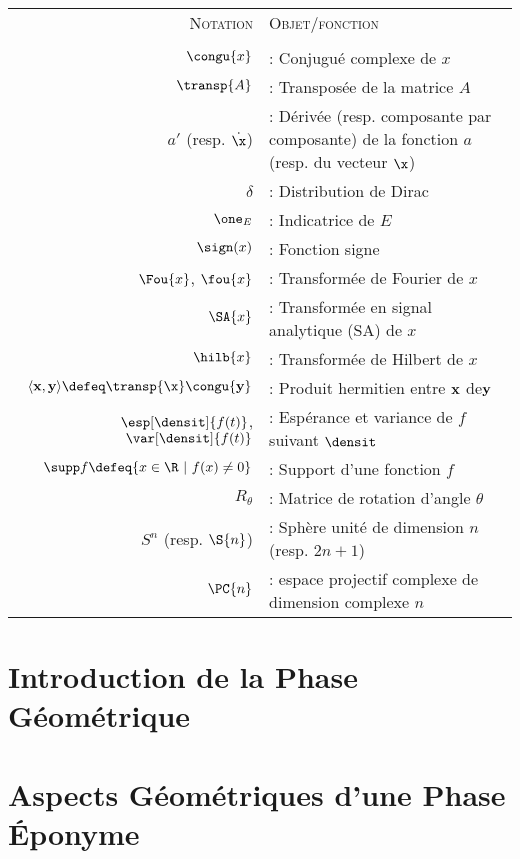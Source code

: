  \begin{tabular}{ r  l } 
	\textsc{Notation}\qquad\qquad  & \qquad\qquad\textsc{Objet/fonction} \\ \\
	$\congu{x}$  &  : Conjugué complexe  de $x$ \\ 
	$\transp{A}$   &  : Transposée de la matrice $A$ \\ 
	$a'$ (resp. $\dot{\x}$)   & :  Dérivée (resp. composante par composante) de la fonction $a$ (resp. du vecteur $\x$) \\ 
	$\delta$  &  : Distribution de Dirac\\ 
	$\one_E$  &  : Indicatrice de $E$ \\ 
	$\sign(x)$  &  : Fonction signe \\ 
	$\Fou{x}$, $\fou{x}$  &  : Transformée de Fourier de $x$ \\ 
	$\SA{x}$  &  : Transformée en signal analytique (SA) de $x$\\ 
	$\hilb{x}$   &  : Transformée de Hilbert de $x$\\ 
	$\langle \bf{x}, \bf{y}\rangle\defeq \transp{\x}\congu{\bf{y}}$  &  : Produit hermitien entre $\bf{x}$ de$\bf{y}$\\ 
	$\esp[\densit]{f(t)}$, $\var[\densit]{f(t)}$  &  : Espérance et variance de $f$ suivant $\densit$  \\ 
	$\supp f \defeq\{x\in\R\ |\ f(x)\neq0\}$  &  : Support d'une fonction $f$\\ 
	$R_\theta$  &  : Matrice de rotation d'angle $\theta$ \\ 
	$S^{n}$ (resp. $\S{n}$) &  : Sphère unité de dimension $n$ (resp. $2n+1$) \\
	$\PC{n}$  &  : espace projectif complexe de dimension complexe $n$
\end{tabular}



\newpage

\tableofcontents\thispagestyle{empty}







\part{Introduction de la Phase Géométrique} \label{part:param_instant} 


\part{Aspects Géométriques d'une Phase Éponyme} \label{part:phase_geo} 



